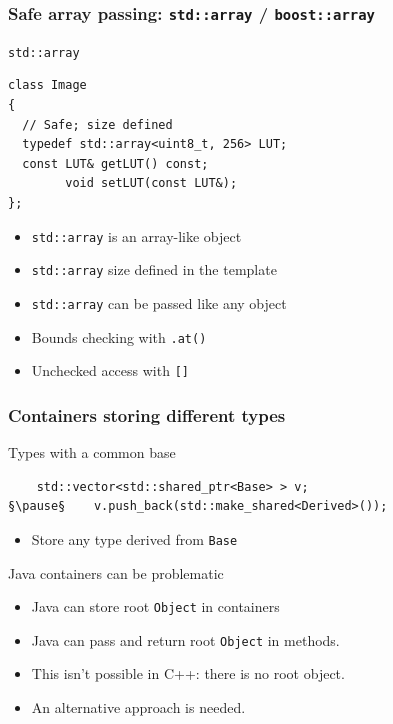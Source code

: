 \documentclass[handout]{beamer}
\begin{document}
\begin{frame}[fragile]
  \frametitle{Safe array passing: \texttt{std::array} / \texttt{boost::array}}
  \begin{block}{\texttt{std::array}}
  \begin{lstlisting}
class Image
{
  // Safe; size defined
  typedef std::array<uint8_t, 256> LUT;
  const LUT& getLUT() const;
        void setLUT(const LUT&);
};
\end{lstlisting}
  \begin{itemize}
  \item<1-> \texttt{std::array} is an array-like object
  \item<2-> \texttt{std::array} size defined in the template
  \item<3-> \texttt{std::array} can be passed like any object
  \item<4-> Bounds checking with \texttt{.at()}
  \item<4-> Unchecked access with \texttt{[]}
  \end{itemize}
  \end{block}
\end{frame}

\begin{frame}[fragile]
  \frametitle{Containers storing different types}
\begin{block}{Types with a common base}
  \begin{lstlisting}
    std::vector<std::shared_ptr<Base> > v;
§\pause§    v.push_back(std::make_shared<Derived>());
\end{lstlisting}
  \begin{itemize}
    \pause
  \item Store any type derived from \texttt{Base}
  \end{itemize}
\end{block}
\pause
\begin{block}{Java containers can be problematic}
  \begin{itemize}
  \item Java can store root \texttt{Object} in containers
  \item Java can pass and return root \texttt{Object} in methods.
    \pause
  \item This isn't possible in C++: there is no root object.
  \item An alternative approach is needed.
  \end{itemize}
\end{block}
\end{frame}
\end{document}
